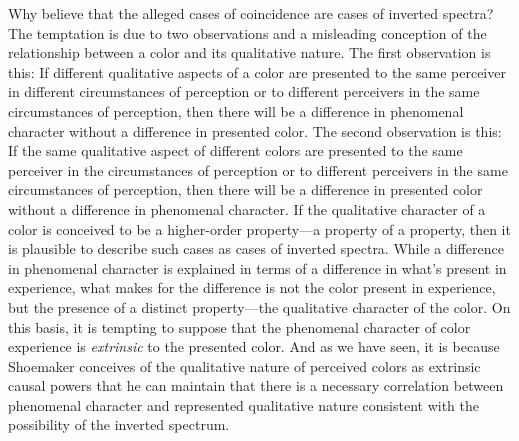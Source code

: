 \documentclass[12pt]{article}
\begin{document}
Why believe that the alleged cases of coincidence are cases of inverted spectra? The temptation is due to two observations and a misleading conception of the relationship between a color and its qualitative nature. The first observation is this: If different qualitative aspects of a color are presented to the same perceiver in different circumstances of perception or to different perceivers in the same circumstances of perception, then there will be a difference in phenomenal character without a difference in presented color. The second observation is this: If the same qualitative aspect of different colors are presented to the same perceiver in the circumstances of perception or to different perceivers in the same circumstances of perception, then there will be a difference in presented color without a difference in phenomenal character. If the qualitative character of a color is conceived to be a higher-order property---a property of a property, then it is plausible to describe such cases as cases of inverted spectra. While a difference in phenomenal character is explained in terms of a difference in what's present in experience, what makes for the difference is not the color present in experience, but the presence of a distinct property---the qualitative character of the color. On this basis, it is tempting to suppose that the phenomenal character of color experience is \emph{extrinsic} to the presented color. And as we have seen, it is because Shoemaker conceives of the qualitative nature of perceived colors as extrinsic causal powers that he can maintain that there is a necessary correlation between phenomenal character and represented qualitative nature consistent with the possibility of the inverted spectrum.
\end{document}
